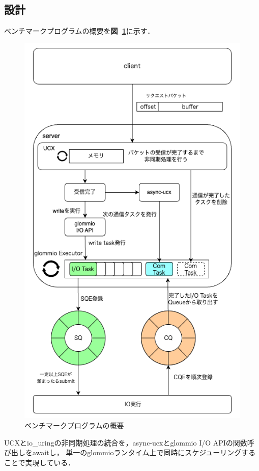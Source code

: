 \documentclass[a4paper,11pt,openany]{jreport}
\newcommand\figref[1]{\textbf{図~\ref{fig:#1}}}
\begin{document}
\subsection{設計}\label{sec:io_rpc_benchprog}
ベンチマークプログラムの概要を\figref{benchmark}に示す．
\begin{figure}[tb]
	\centering
	\includegraphics[width=13cm, bb=0 0 520 710]{figures/rpc_overview.png}
	\caption{ベンチマークプログラムの概要}
	\label{fig:benchmark}
\end{figure}

UCXとio\_uringの非同期処理の統合を，async-ucxとglommio I/O APIの関数呼び出しをawaitし，
単一のglommioランタイム上で同時にスケジューリングすることで実現している．
\end{document}
